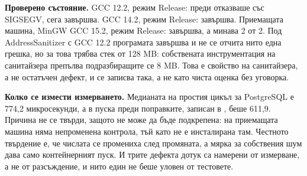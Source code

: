 \textbf{Проверено състояние.} GCC 12.2, режим Release: преди отказваше със SIGSEGV, сега
завършва. GCC 14.2, режим Release: завършва. Приемащата машина, MinGW GCC 15.2, режим Release:
завършва, а  минава 2 от 2. Под AddressSanitizer с GCC 12.2 програмата завършва и
не се отчита нито една грешка, но за това трябва стек от 128 MB: собствената инструментация
на санитайзера препълва подразбиращите се 8 MB. Това е свойство на санитайзера, а не остатъчен
дефект, и се записва така, а не като чиста оценка без уговорка.

\textbf{Колко се измести измерването.} Медианата на простия цикъл за PostgreSQL е 774,2
микросекунди, а в пуска преди поправките, записан в ,
беше 611,9. Причина не се твърди, защото не може да бъде подкрепена: на приемащата машина няма
непроменена контрола, тъй като  не е инсталирана там. Честното твърдение е, че
числата се промениха след промяната, а мярка за собствения шум дава само контейнерният пуск.
И трите дефекта дотук са намерени от измерване, а не от разсъждение, и нито един не беше
уловен от тестовете.
